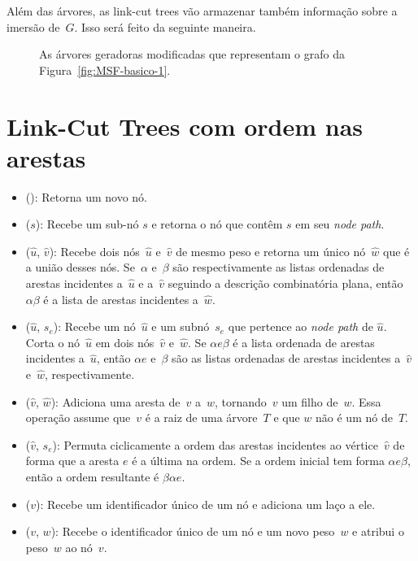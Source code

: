 Além das árvores, as link-cut trees vão armazenar também informação sobre a imersão de~$G$.
Isso será feito da seguinte maneira.


\begin{figure}[htb]
\centering

\caption{As árvores geradoras modificadas que representam o grafo da Figura~\ref{fig:MSF-basico-1}.}
\label{fig:MSF-figura-3}
\end{figure}



\section{Link-Cut Trees com ordem nas arestas}


\begin{itemize}
\item \LCOMakeNode(): Retorna um novo nó.
\item \LCOFindNode($s$): Recebe um sub-nó $s$ e retorna o nó que contêm $s$ em seu \textit{node path}.
\item \LCOMerge($\hat u$, $\hat v$): Recebe dois nós~$\hat u$ e~$\hat v$ de mesmo peso e retorna um único nó~$\hat w$ que é a união desses nós.
Se~$\alpha$ e~$\beta$ são respectivamente as listas ordenadas de arestas incidentes a~$\hat u$ e a~$\hat v$ seguindo a descrição combinatória plana, então $\alpha\beta$ é a lista de arestas incidentes a~$\hat w$.
\item \LCOSplit($\hat u$, $s_e$): Recebe um nó~$\hat u$ e um subnó~$s_e$ que pertence ao \textit{node path} de $\hat u$.
Corta o nó~$\hat u$ em dois nós~$\hat v$ e~$\hat w$. Se $\alpha e\beta$ é a lista ordenada de arestas incidentes a~$\hat u$, então $\alpha e$ e~$\beta$ são as listas ordenadas de arestas incidentes a~$\hat v$ e~$\hat w$, respectivamente.
\item \LCOLink($\hat v$, $\hat w$): Adiciona uma aresta de~$v$ a~$w$, tornando~$v$ um filho de~$w$. Essa operação assume que~$v$ é a raiz de uma árvore~$T$ e que $w$ não é um nó de~$T$.
\item \LCOCycle($\hat v$, $s_e$): Permuta ciclicamente a ordem das arestas incidentes ao vértice~$\hat v$ de forma que a aresta $e$ é a última na ordem. Se a ordem inicial tem forma $\alpha e \beta$, então a ordem resultante é $\beta\alpha e$.
\item \LCOLoop($v$): Recebe um identificador único de um nó e adiciona um laço a ele.
\item \LCOAddCost($v$, $w$): Recebe o identificador único de um nó e um novo peso~$w$ e atribui o peso~$w$ ao nó~$v$.
\end{itemize}

